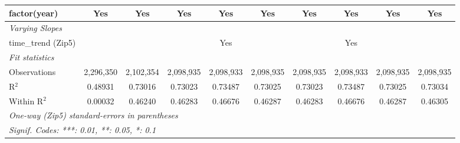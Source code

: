 \begin{table}[H]
{\begin{tabular}{lccccccccc}
 factor(year) & Yes & Yes & Yes & Yes & Yes & Yes & Yes & Yes & Yes\\ 

 \midrule \emph{Varying Slopes}&   &   &   &   &   &   &   &   &  \\ 

 time\_trend (Zip5) &  &  &  & Yes &  &  & Yes &  & \\ 

 \midrule \emph{Fit statistics}&  & & & & & & & & \\ 

 Observations & 2,296,350&2,102,354&2,098,935&2,098,933&2,098,935&2,098,935&2,098,933&2,098,935&2,098,935\\ 

 R$^2$ & 0.48931&0.73016&0.73023&0.73487&0.73025&0.73023&0.73487&0.73025&0.73034\\ 

 Within R$^2$ & 0.00032&0.46240&0.46283&0.46676&0.46287&0.46283&0.46676&0.46287&0.46305\\ 

 \midrule\midrule\multicolumn{10}{l}{\emph{One-way (Zip5) standard-errors in parentheses}}\\ 

 \multicolumn{10}{l}{\emph{Signif. Codes: ***: 0.01, **: 0.05, *: 0.1}}\\ 

 \end{tabular}} 

 \end{table} 

  

